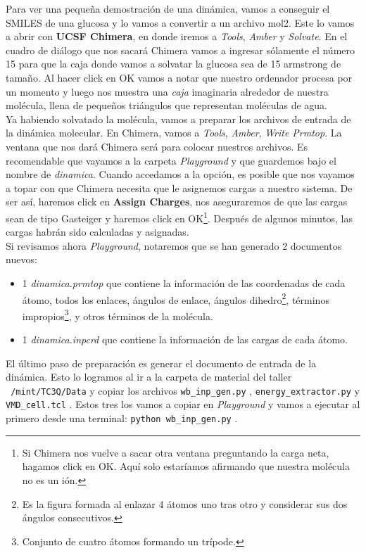 \documentclass[10pt,letterpaper]{article}
\newcommand{\inlinecode}[1]{
\colorbox{light-gray}{\texttt{#1}}
}
\begin{document}
Para ver una peque\~na demostraci\'on de una din\'amica, vamos a conseguir el SMILES de una glucosa y lo vamos a convertir a un archivo mol2. Este lo vamos a abrir con \textbf{UCSF Chimera}, en donde iremos a \textit{Tools}, \textit{Amber} y \textit{Solvate}. En el cuadro de di\'alogo que nos sacar\'a Chimera vamos a ingresar s\'olamente el n\'umero 15 para que la caja donde vamos a solvatar la glucosa sea de 15 armstrong de tama\~no. Al hacer click en OK vamos a notar que nuestro ordenador procesa por un momento y luego nos muestra una \emph{caja} imaginaria alrededor de nuestra mol\'ecula, llena de peque\~nos tri\'angulos que representan mol\'eculas de agua.\\

Ya habiendo solvatado la mol\'ecula, vamos a preparar los archivos de entrada de la din\'amica molecular. En Chimera, vamos a \textit{Tools}, \textit{Amber}, \textit{Write Prmtop}. La ventana que nos dar\'a Chimera ser\'a para colocar nuestros archivos. Es recomendable que vayamos a la carpeta \textit{Playground} y que guardemos bajo el nombre de \textit{dinamica}. Cuando accedamos a la opci\'on, es posible que nos vayamos a topar con que Chimera necesita que le asignemos cargas a nuestro sistema. De ser as\'i, haremos click en \textbf{Assign Charges}, nos aseguraremos de que las cargas sean de tipo Gasteiger y haremos click en OK\footnote{Si Chimera nos vuelve a sacar otra ventana preguntando la carga neta, hagamos click en OK. Aqu\'i solo estar\'iamos afirmando que nuestra mol\'ecula no es un i\'on.}. Despu\'es de algunos minutos, las cargas habr\'an sido calculadas y asignadas.\\

Si revisamos ahora \textit{Playground}, notaremos que se han generado 2 documentos nuevos:

\begin{itemize}
\item 1 \emph{dinamica.prmtop} que contiene la informaci\'on de las coordenadas de cada \'atomo, todos los enlaces, \'angulos de enlace, \'angulos dihedro\footnote{Es la figura formada al enlazar 4 \'atomos uno tras otro y considerar sus dos \'angulos consecutivos.}, t\'erminos impropios\footnote{Conjunto de cuatro \'atomos formando un tr\'ipode.}, y otros t\'erminos de la mol\'ecula.
\item 1 \emph{dinamica.inpcrd} que contiene la informaci\'on de las cargas de cada \'atomo.
\end{itemize}

El \'ultimo paso de preparaci\'on es generar el documento de entrada de la din\'amica. Esto lo logramos al ir a la carpeta de material del taller \inlinecode{~/mint/TC3Q/Data} y copiar los archivos \inlinecode{wb\_inp\_gen.py}, \inlinecode{energy\_extractor.py} y \inlinecode{VMD\_cell.tcl}. Estos tres los vamos a copiar en \textit{Playground} y vamos a ejecutar al primero desde una terminal: \inlinecode{python wb\_inp\_gen.py}.\\
\end{document}
